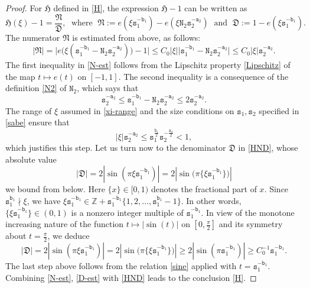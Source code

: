 \documentclass[12pt, twoside]{article}
\theoremstyle{definition}
\numberwithin{equation}{section}
\begin{document}
\begin{proof} 
For $\mathfrak H$ defined in \eqref{H}, the expression $\mathfrak H - 1$ can  be written as 
\begin{equation} \label{HND}
\mathfrak H(\xi) -  1= \frac{\mathfrak N}{\mathfrak D}, \; \text{ where } \; \mathfrak N := e(\xi \mathtt s_1^{-\mathtt b_1}) - e(\xi \mathtt N_2 \mathtt s_2^{-\mathtt a_2}) \; \text{ and } \; \mathfrak D := 1 - e(\xi \mathtt s_1^{-\mathtt b_1}). 
\end{equation}   
The numerator $\mathfrak N$ is estimated from above, as follows: 
\begin{equation} \label{N-est}  
|\mathfrak N| = \bigl| e \bigl(\xi( \mathtt s_1^{-\mathtt b_1} - \mathtt N_2 \mathtt s_2^{-\mathtt a_2}) \bigr) -1 \bigr| \leq C_0 |\xi| \bigl| \mathtt s_1^{-\mathtt b_1}  - \mathtt N_2 \mathtt s_2^{-\mathtt a_2} \bigr| \leq C_0 |\xi| \mathtt s_2^{-\mathtt a_2}. 
\end{equation}   
The first inequality in \eqref{N-est} follows from the Lipschitz property \eqref{Lipschitz} of the map $t \mapsto e(t)$ on $[-1,1]$. The second inequality is a consequence of the definition \eqref{N2} of $\mathtt N_2$, which says that 
\[ \mathtt s_2^{-\mathtt a_2} \leq \mathtt s_1^{-\mathtt b_1} - \mathtt N_2 \mathtt s_2^{-\mathtt a_2} \leq 2 \mathtt s_2^{-\mathtt a_2}. \]  The range of $\xi$ assumed in \eqref{xi-range} and the size conditions on $\mathtt s_1, \mathtt s_2$ specified in \eqref{sabe} ensure that 
\[ |\xi| \mathtt s_2^{-\mathtt a_2} \leq  \mathtt s_1^{\frac{\mathtt b_1}{2}} \mathtt s_2^{-\frac{\mathtt a_2}{2}} < 1, \]
which justifies this step. 
\vskip0.1in 
\noindent Let us turn now to the denominator $\mathfrak D$ in \eqref{HND}, whose absolute value 
\[ |\mathfrak D| = 2 |\sin(\pi \xi \mathtt s_1^{-\mathtt b_1})| = 2 |\sin \bigl(\pi \{\xi \mathtt s_1^{-\mathtt b_1} \} \bigr)| \]  we bound from below. Here $\{x\} \in [0, 1)$ denotes the fractional part of $x$. Since $\mathtt s_1^{\mathtt b_1} \nmid \xi$, we have $\xi \mathtt s_1^{-\mathtt b_1} \in \mathbb Z + \mathtt s_1^{-\mathtt b_1} \{1, 2, \ldots, \mathtt s_1^{\mathtt b_1}-1\}$. 
In other words, $\{\xi \mathtt s_1^{-\mathtt b_1}\} \in (0, 1)$ is a nonzero integer multiple of $\mathtt s_1^{-\mathtt b_1}$. In view of the monotone increasing nature of the function $t \mapsto |\sin(t)|$ on $[0, \frac{\pi}{2}]$ and its symmetry about $t = \frac{\pi}{2}$, we deduce   
\begin{equation} \label{D-est} 
|\mathfrak D| = 2|\sin(\pi \xi \mathtt s_1^{-\mathtt b_1})| =  2|\sin \bigl(\pi \{\xi \mathtt s_1^{-\mathtt b_1} \} \bigr)| \geq 2|\sin(\pi \mathtt s_1^{-\mathtt b_1})| \geq C_0^{-1} \mathtt s_1^{-\mathtt b_1}.
\end{equation} 
The last step above follows from the relation \eqref{sine} applied with $t = \mathtt s_1^{-\mathtt b_1}$. Combining \eqref{N-est}, \eqref{D-est} with \eqref{HND} leads to the conclusion \eqref{H}. 
\end{proof} 
\end{document}
